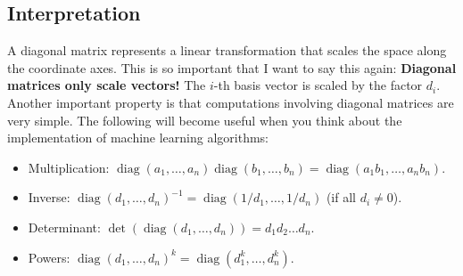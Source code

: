 \documentclass{article}
\DeclareMathOperator{\diag}{diag}  %
\begin{document}
\subsection*{Interpretation}
A diagonal matrix represents a linear transformation that scales the space along the coordinate axes. This is so important that I want to say this again: \textbf{Diagonal matrices only scale vectors!} The $i$-th basis vector is scaled by the factor $d_i$. Another important property is that computations involving diagonal matrices are very simple. The following will become useful when you think about the implementation of machine learning algorithms:
\begin{itemize}
    \item Multiplication: $\diag(a_1, \dots, a_n) \diag(b_1, \dots, b_n) = \diag(a_1 b_1, \dots, a_n b_n)$.
    \item Inverse: $\diag(d_1, \dots, d_n)^{-1} = \diag(1/d_1, \dots, 1/d_n)$ (if all $d_i \neq 0$).
    \item Determinant: $\det(\diag(d_1, \dots, d_n)) = d_1 d_2 \dots d_n$.
    \item Powers: $\diag(d_1, \dots, d_n)^k = \diag(d_1^k, \dots, d_n^k)$.
\end{itemize}
\end{document}
